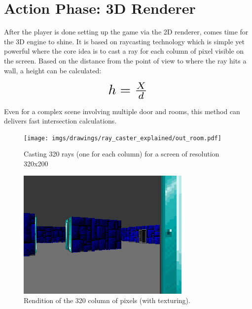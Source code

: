 \section{Action Phase: 3D Renderer}
After the player is done setting up the game via the 2D renderer, comes time for the 3D engine to shine. It is based on raycasting technology which is simple yet powerful where the core idea is to cast a ray for each column of pixel visible on the screen. Based on the distance  from the point of view to where the ray hits a wall, a height  can be calculated:\\
\par
\begin{figure}[H]
  \centering
  \begin{equation*}
      \scalebox{2.0}{$h = \frac{X}{d}$}
  \end{equation*}
\end{figure}
\par
Even for a complex scene involving multiple door and rooms, this method can delivers fast intersection calculations.
\par
\begin{figure}[H]
\centering
 \texttt{[image: imgs/drawings/ray\_caster\_explained/out\_room.pdf]}
 \caption{Casting 320 rays (one for each column) for a screen of resolution 320x200} \label{fig:Raycasting2}
\end{figure}

\begin{figure}[H]
  \centering
 \includegraphics[width=\textwidth]{imgs/drawings/ray_caster_explained/out_door.png}
 \caption{Rendition of the 320 column of pixels (with texturing).} 
\end{figure} 


